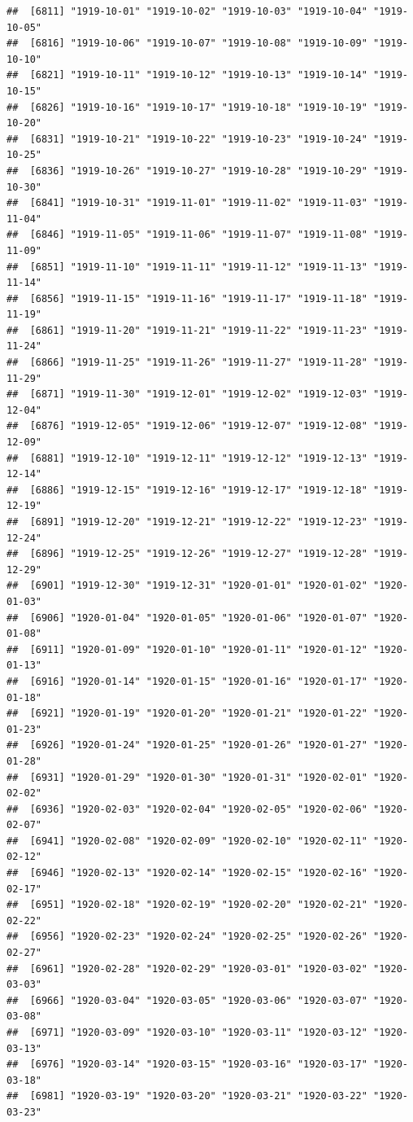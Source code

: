 \documentclass{article}\usepackage[]{graphicx}\usepackage[]{color}
\makeatletter
\newenvironment{kframe}{%
 \def\at@end@of@kframe{}%
 \ifinner\ifhmode%
  \def\at@end@of@kframe{\end{minipage}}%
  \begin{minipage}{\columnwidth}%
 \fi\fi%
 \def\FrameCommand##1{\hskip\@totalleftmargin \hskip-\fboxsep
 \colorbox{shadecolor}{##1}\hskip-\fboxsep
     \hskip-\linewidth \hskip-\@totalleftmargin \hskip\columnwidth}%
 \MakeFramed {\advance\hsize-\width
   \@totalleftmargin\z@ \linewidth\hsize
   \@setminipage}}%
 {\par\unskip\endMakeFramed%
 \at@end@of@kframe}
\newenvironment{knitrout}{}{} %
\makeatother
\begin{document}
\begin{description}
\begin{knitrout}
\begin{kframe}
\begin{verbatim}
##  [6811] "1919-10-01" "1919-10-02" "1919-10-03" "1919-10-04" "1919-10-05"
##  [6816] "1919-10-06" "1919-10-07" "1919-10-08" "1919-10-09" "1919-10-10"
##  [6821] "1919-10-11" "1919-10-12" "1919-10-13" "1919-10-14" "1919-10-15"
##  [6826] "1919-10-16" "1919-10-17" "1919-10-18" "1919-10-19" "1919-10-20"
##  [6831] "1919-10-21" "1919-10-22" "1919-10-23" "1919-10-24" "1919-10-25"
##  [6836] "1919-10-26" "1919-10-27" "1919-10-28" "1919-10-29" "1919-10-30"
##  [6841] "1919-10-31" "1919-11-01" "1919-11-02" "1919-11-03" "1919-11-04"
##  [6846] "1919-11-05" "1919-11-06" "1919-11-07" "1919-11-08" "1919-11-09"
##  [6851] "1919-11-10" "1919-11-11" "1919-11-12" "1919-11-13" "1919-11-14"
##  [6856] "1919-11-15" "1919-11-16" "1919-11-17" "1919-11-18" "1919-11-19"
##  [6861] "1919-11-20" "1919-11-21" "1919-11-22" "1919-11-23" "1919-11-24"
##  [6866] "1919-11-25" "1919-11-26" "1919-11-27" "1919-11-28" "1919-11-29"
##  [6871] "1919-11-30" "1919-12-01" "1919-12-02" "1919-12-03" "1919-12-04"
##  [6876] "1919-12-05" "1919-12-06" "1919-12-07" "1919-12-08" "1919-12-09"
##  [6881] "1919-12-10" "1919-12-11" "1919-12-12" "1919-12-13" "1919-12-14"
##  [6886] "1919-12-15" "1919-12-16" "1919-12-17" "1919-12-18" "1919-12-19"
##  [6891] "1919-12-20" "1919-12-21" "1919-12-22" "1919-12-23" "1919-12-24"
##  [6896] "1919-12-25" "1919-12-26" "1919-12-27" "1919-12-28" "1919-12-29"
##  [6901] "1919-12-30" "1919-12-31" "1920-01-01" "1920-01-02" "1920-01-03"
##  [6906] "1920-01-04" "1920-01-05" "1920-01-06" "1920-01-07" "1920-01-08"
##  [6911] "1920-01-09" "1920-01-10" "1920-01-11" "1920-01-12" "1920-01-13"
##  [6916] "1920-01-14" "1920-01-15" "1920-01-16" "1920-01-17" "1920-01-18"
##  [6921] "1920-01-19" "1920-01-20" "1920-01-21" "1920-01-22" "1920-01-23"
##  [6926] "1920-01-24" "1920-01-25" "1920-01-26" "1920-01-27" "1920-01-28"
##  [6931] "1920-01-29" "1920-01-30" "1920-01-31" "1920-02-01" "1920-02-02"
##  [6936] "1920-02-03" "1920-02-04" "1920-02-05" "1920-02-06" "1920-02-07"
##  [6941] "1920-02-08" "1920-02-09" "1920-02-10" "1920-02-11" "1920-02-12"
##  [6946] "1920-02-13" "1920-02-14" "1920-02-15" "1920-02-16" "1920-02-17"
##  [6951] "1920-02-18" "1920-02-19" "1920-02-20" "1920-02-21" "1920-02-22"
##  [6956] "1920-02-23" "1920-02-24" "1920-02-25" "1920-02-26" "1920-02-27"
##  [6961] "1920-02-28" "1920-02-29" "1920-03-01" "1920-03-02" "1920-03-03"
##  [6966] "1920-03-04" "1920-03-05" "1920-03-06" "1920-03-07" "1920-03-08"
##  [6971] "1920-03-09" "1920-03-10" "1920-03-11" "1920-03-12" "1920-03-13"
##  [6976] "1920-03-14" "1920-03-15" "1920-03-16" "1920-03-17" "1920-03-18"
##  [6981] "1920-03-19" "1920-03-20" "1920-03-21" "1920-03-22" "1920-03-23"

\end{verbatim}
\end{kframe}
\end{knitrout}
\end{description}
\end{document}
